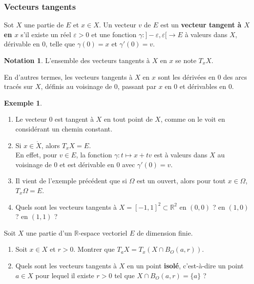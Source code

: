 \documentclass[french]{article}
\newcommand{\R}{\mathbb{R}}
\theoremstyle{plain}
\theoremstyle{definition}
\newtheorem*{ex}{Exemple}
\newtheorem*{notation}{Notation}
\theoremstyle{remark}
\begin{document}
\subsubsection*{Vecteurs tangents}

\begin{dfn}
	Sot $X$ une partie de $E$ et $x\in X$. Un vecteur $v$ de $E$ est un \textbf{vecteur tangent à $X$ en $x$} s'il existe un réel $\varepsilon>0$ et une fonction $\gamma:]-\varepsilon,\varepsilon[\to E$ à valeurs dans $X$, dérivable en $0$, telle que $\gamma(0)=x$ et $\gamma'(0)=v$.
\end{dfn}

\begin{notation}
	L'ensemble des vecteurs tangents à $X$ en $x$ se note $T_xX$.
\end{notation}

En d'autres termes, les vecteurs tangents à $X$ en $x$ sont les dérivées en $0$ des arcs tracés sur $X$, définis au voisinage de $0$, passant par $x$ en $0$ et dérivables en $0$.

\begin{ex}
	\begin{enumerate}
		\item Le vecteur $0$ est tangent à $X$ en tout point de $X$, comme on le voit en considérant un chemin constant.
		\item Si $x\in\mathring{X}$, alors $T_xX=E$.\\
		En effet, pour $v\in E$, la fonction $\gamma:t\mapsto x+tv$ est à valeurs dans $X$ au voisinage de $0$ et est dérivable en $0$ avec $\gamma'(0)=v$. %
		\item Il vient de l'exemple précédent que si $\Omega$ est un ouvert, alors pour tout $x\in\Omega$, $T_x\Omega=E$.
		\item Quels sont les vecteurs tangents à $X=[-1,1]^2\subset\R^2$ en $(0,0)$ ? en $(1,0)$ ? en $(1,1)$ ?
	\end{enumerate}	
\end{ex}

\begin{exo}
	Soit $X$ une partie d'un $\R$-espace vectoriel $E$ de dimension finie.
	\begin{enumerate}
		\item Soit $x\in X$ et $r>0$. Montrer que $T_aX=T_x(X\cap B_O(a,r))$.
		\item Quels sont les vecteurs tangents à $X$ en un point \textbf{isolé}, c'est-à-dire un point $a\in X$ pour lequel il existe $r>0$ tel que $X\cap B_O(a,r)=\{a\}$ ?
	\end{enumerate}
\end{exo}
\end{document}
